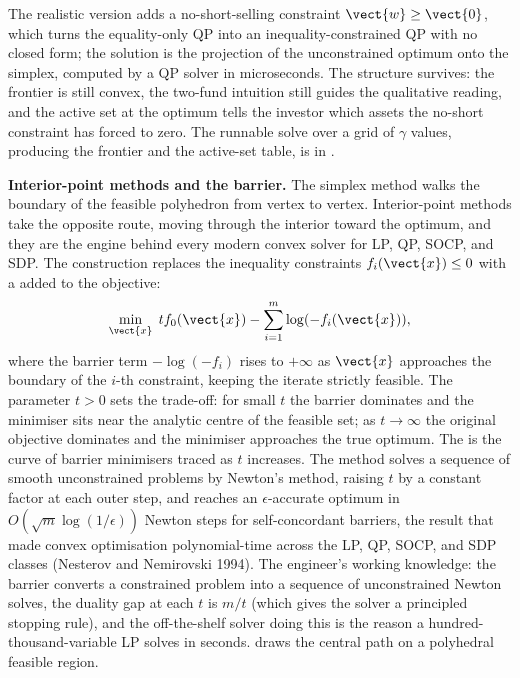 

The realistic version adds a no-short-selling constraint
$\vect{w} \geq \vect{0}$, which turns the equality-only QP into an
inequality-constrained QP with no closed form; the solution is the
projection of the unconstrained optimum onto the simplex, computed
by a QP solver in microseconds. The structure survives: the
frontier is still convex, the two-fund intuition still guides the
qualitative reading, and the active set at the optimum tells the
investor which assets the no-short constraint has forced to zero.
The runnable solve over a grid of $\gamma$ values, producing the
frontier and the active-set table, is in
.

\begin{mastery}
\textbf{Interior-point methods and the barrier.} The simplex
method walks the boundary of the feasible polyhedron from vertex
to vertex. Interior-point methods take the opposite route, moving
through the interior toward the optimum, and they are the engine
behind every modern convex solver for LP, QP, SOCP, and SDP. The
construction replaces the inequality constraints $f_{i}(\vect{x})
\leq 0$ with a  added to the
objective:
\[
\min_{\vect{x}} \; t f_{0}(\vect{x}) - \sum_{i=1}^{m} \log(-f_{i}
(\vect{x})),
\]
where the barrier term $-\log(-f_{i})$ rises to $+\infty$ as
$\vect{x}$ approaches the boundary of the $i$-th constraint,
keeping the iterate strictly feasible. The parameter $t > 0$ sets
the trade-off: for small $t$ the barrier dominates and the
minimiser sits near the analytic centre of the feasible set; as
$t \to \infty$ the original objective dominates and the minimiser
approaches the true optimum. The  is the
curve of barrier minimisers traced as $t$ increases. The method
solves a sequence of smooth unconstrained problems by Newton's
method, raising $t$ by a constant factor at each outer step, and
reaches an $\epsilon$-accurate optimum in $O(\sqrt{m} \log(1/
\epsilon))$ Newton steps for self-concordant barriers, the result
that made convex optimisation polynomial-time across the LP, QP,
SOCP, and SDP classes (Nesterov and Nemirovski 1994). The
engineer's working knowledge: the barrier converts a constrained
problem into a sequence of unconstrained Newton solves, the
duality gap at each $t$ is $m/t$ (which gives the solver a
principled stopping rule), and the off-the-shelf solver doing
this is the reason a hundred-thousand-variable LP solves in
seconds.  draws the central path
on a polyhedral feasible region.
\end{mastery}

